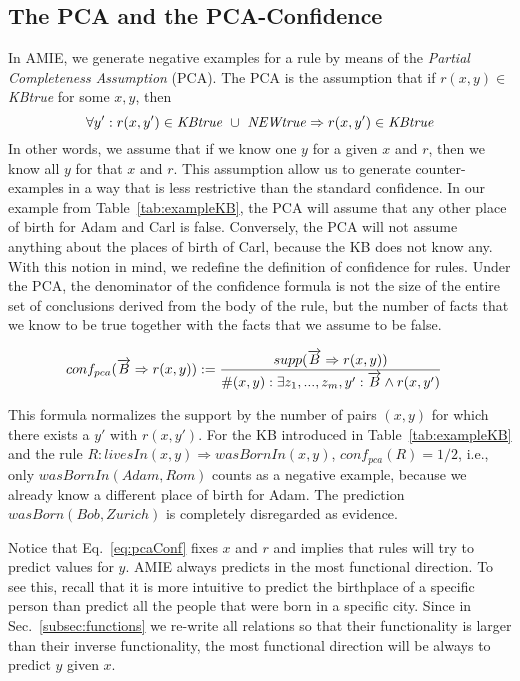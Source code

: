 \subsection{The PCA and the PCA-Confidence}\label{subsubsec:pcaConf}

In AMIE, we generate negative examples for a rule by means of the \emph{Partial Completeness Assumption} (PCA).
The PCA is the assumption that if $r(x,y) \in$ \emph{KBtrue} for some $x,y$, then
\[\forall y': r(x,y') \in \mbox{\emph{KBtrue}}\ \cup\ \mbox{\emph{NEWtrue}} \Rightarrow r(x,y') \in \mbox{\emph{KBtrue}}\]
In other words, we assume that if we know one $y$ for a given $x$ and $r$, then we know all $y$ for that $x$ and $r$.
This assumption allow us to generate counter-examples in a way that is less restrictive than the standard confidence.
In our example from Table~\ref{tab:exampleKB}, the PCA will assume that any other place of birth for 
Adam and Carl is false. Conversely, the PCA will not assume anything about the places of birth of Carl, because
the KB does not know any.
With this notion in mind, we redefine the definition of confidence for rules. Under the PCA, 
the denominator of the confidence formula is not the size of the entire set of conclusions 
derived from the body of the rule,
but the number of facts that we know to be true together with the facts that we assume to be false.

\begin{small}
\begin{equation} \label{eq:pcaConf}
 \hspace*{-2ex}
conf_{pca}(\vec{B} \Rightarrow r(x,y)) := \frac{supp(\vec{B} \Rightarrow r(x,y))}{\#(x,y): \exists z_1,...,z_m,y': \vec{B} \wedge r(x,y')}
\end{equation}
\end{small}

This formula normalizes the support by the number of pairs $(x,y)$ for which there exists a $y'$ with $r(x,y')$.
For the KB introduced in Table~\ref{tab:exampleKB} and the rule $R: livesIn(x,y)\Rightarrow wasBornIn(x,y)$,
$conf_{pca}(R)=1/2$, i.e., only $wasBornIn(Adam, Rom)$ counts as a negative example, 
because we already know a different place of birth for Adam. The prediction $wasBorn(Bob,Zurich)$ is completely disregarded as evidence.

Notice that Eq.~\ref{eq:pcaConf} fixes $x$ and $r$ and implies that rules will try to predict values for $y$. 
AMIE always predicts in the most functional direction. To see this, recall that 
it is more intuitive to predict the birthplace of a specific person 
than predict all the people that were born in a specific city.
Since in Sec.~\ref{subsec:functions} we re-write all relations so that their functionality 
is larger than their inverse functionality, the most functional direction 
will be always to predict $y$ given $x$.

